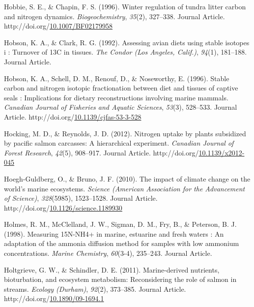 \documentclass [11pt, proquest] {uwthesis}[2015/03/03]
\newlength{\cslhangindent}
\newenvironment{CSLReferences}%
{\setlength{\parindent}{0pt}%
\everypar{\setlength{\hangindent}{\cslhangindent}}\ignorespaces}%
{\par}
\begin{document}
\begin{CSLReferences}{1}{0}
\leavevmode\hypertarget{ref-Hobbie1996}{}%
Hobbie, S. E., \& Chapin, F. S. (1996). Winter regulation of tundra litter carbon and nitrogen dynamics. \emph{Biogeochemistry}, \emph{35}(2), 327--338. Journal Article. http://doi.org/\href{https://doi.org/10.1007/BF02179958}{10.1007/BF02179958}

\leavevmode\hypertarget{ref-Hobson1992}{}%
Hobson, K. A., \& Clark, R. G. (1992). Assessing avian diets using stable isotopes i : Turnover of 13C in tissues. \emph{The Condor (Los Angeles, Calif.)}, \emph{94}(1), 181--188. Journal Article.

\leavevmode\hypertarget{ref-Hobson1996}{}%
Hobson, K. A., Schell, D. M., Renouf, D., \& Noseworthy, E. (1996). Stable carbon and nitrogen isotopic fractionation between diet and tissues of captive seals : Implications for dietary reconstructions involving marine mammals. \emph{Canadian Journal of Fisheries and Aquatic Sciences}, \emph{53}(3), 528--533. Journal Article. http://doi.org/\href{https://doi.org/10.1139/cjfas-53-3-528}{10.1139/cjfas-53-3-528}

\leavevmode\hypertarget{ref-Hocking2012}{}%
Hocking, M. D., \& Reynolds, J. D. (2012). Nitrogen uptake by plants subsidized by pacific salmon carcasses: A hierarchical experiment. \emph{Canadian Journal of Forest Research}, \emph{42}(5), 908--917. Journal Article. http://doi.org/\href{https://doi.org/10.1139/x2012-045}{10.1139/x2012-045}

\leavevmode\hypertarget{ref-Hoegh2010}{}%
Hoegh-Guldberg, O., \& Bruno, J. F. (2010). The impact of climate change on the world's marine ecosystems. \emph{Science (American Association for the Advancement of Science)}, \emph{328}(5985), 1523--1528. Journal Article. http://doi.org/\href{https://doi.org/10.1126/science.1189930}{10.1126/science.1189930}

\leavevmode\hypertarget{ref-Holmes1998}{}%
Holmes, R. M., McClelland, J. W., Sigman, D. M., Fry, B., \& Peterson, B. J. (1998). Measuring 15N-NH4+ in marine, estuarine and fresh waters : An adaptation of the ammonia diffusion method for samples with low ammonium concentrations. \emph{Marine Chemistry}, \emph{60}(3-4), 235--243. Journal Article.

\leavevmode\hypertarget{ref-Holtgrieve2011}{}%
Holtgrieve, G. W., \& Schindler, D. E. (2011). Marine-derived nutrients, bioturbation, and ecosystem metabolism: Reconsidering the role of salmon in streams. \emph{Ecology (Durham)}, \emph{92}(2), 373--385. Journal Article. http://doi.org/\href{https://doi.org/10.1890/09-1694.1}{10.1890/09-1694.1}


\end{CSLReferences}
\end{document}
